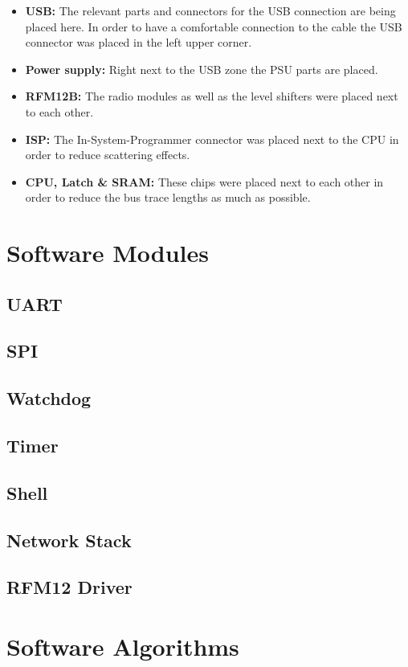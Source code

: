 \begin{itemize}
\item \textbf{USB: } The relevant parts and connectors for the USB connection are being placed here. In order to have a comfortable connection to the cable the USB connector was placed in the left upper corner.
\item \textbf{Power supply: } Right next to the USB zone the PSU parts are placed.
\item \textbf{RFM12B: } The radio modules as well as the level shifters were placed next to each other.
\item \textbf{ISP: } The In-System-Programmer connector was placed next to the CPU in order to reduce scattering effects.
\item \textbf{CPU, Latch \& SRAM: } These chips were placed next to each other in order to reduce the bus trace lengths as much as possible.
\end{itemize}

\chapter{Software Modules}
\section{UART}
\section{SPI}
\section{Watchdog}
\section{Timer}
\section{Shell}
\section{Network Stack}
\section{RFM12 Driver}

\chapter{Software Algorithms}
